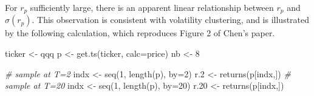 \documentclass[
  11pt,
]{article}
\newenvironment{Shaded}{\begin{snugshade}}{\end{snugshade}}
\newcommand{\AttributeTok}[1]{\textcolor[rgb]{0.77,0.63,0.00}{#1}}
\newcommand{\CommentTok}[1]{\textcolor[rgb]{0.56,0.35,0.01}{\textit{#1}}}
\newcommand{\DecValTok}[1]{\textcolor[rgb]{0.00,0.00,0.81}{#1}}
\newcommand{\FloatTok}[1]{\textcolor[rgb]{0.00,0.00,0.81}{#1}}
\newcommand{\FunctionTok}[1]{\textcolor[rgb]{0.00,0.00,0.00}{#1}}
\newcommand{\NormalTok}[1]{#1}
\newcommand{\OtherTok}[1]{\textcolor[rgb]{0.56,0.35,0.01}{#1}}
\newcommand{\StringTok}[1]{\textcolor[rgb]{0.31,0.60,0.02}{#1}}
\begin{document}
For \(r_p\) sufficiently large, there is an apparent linear relationship between \(r_p\) and \(\sigma(r_p)\). This observation is consistent with volatility clustering, and is illustrated by the following calculation, which reproduces Figure 2 of Chen's paper.

\begin{Shaded}
\begin{Highlighting}[]
\NormalTok{ticker }\OtherTok{\textless{}{-}} \StringTok{\textquotesingle{}qqq\textquotesingle{}}
\NormalTok{p }\OtherTok{\textless{}{-}} \FunctionTok{get.ts}\NormalTok{(ticker, }\AttributeTok{calc=}\StringTok{\textquotesingle{}price\textquotesingle{}}\NormalTok{)}
\NormalTok{nb }\OtherTok{\textless{}{-}} \DecValTok{8}

\CommentTok{\# sample at T=2}
\NormalTok{indx }\OtherTok{\textless{}{-}} \FunctionTok{seq}\NormalTok{(}\DecValTok{1}\NormalTok{, }\FunctionTok{length}\NormalTok{(p), }\AttributeTok{by=}\DecValTok{2}\NormalTok{)}
\NormalTok{r}\FloatTok{.2} \OtherTok{\textless{}{-}} \FunctionTok{returns}\NormalTok{(p[indx,])}
\CommentTok{\# sample at T=20}
\NormalTok{indx }\OtherTok{\textless{}{-}} \FunctionTok{seq}\NormalTok{(}\DecValTok{1}\NormalTok{, }\FunctionTok{length}\NormalTok{(p), }\AttributeTok{by=}\DecValTok{20}\NormalTok{)}
\NormalTok{r}\FloatTok{.20} \OtherTok{\textless{}{-}} \FunctionTok{returns}\NormalTok{(p[indx,])}
\end{Highlighting}
\end{Shaded}
\end{document}
